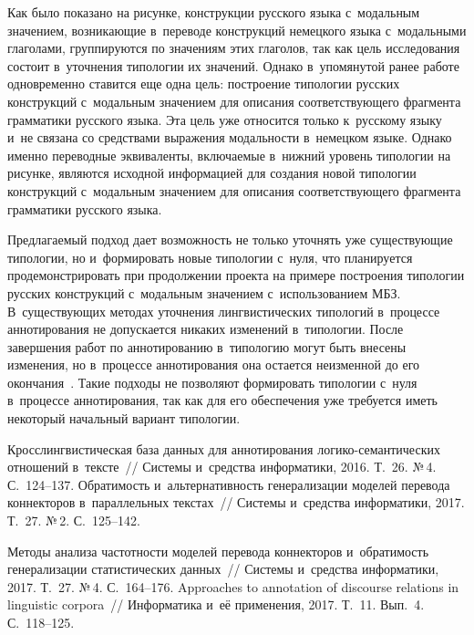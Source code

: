 \begin{multicols}{2}
  Как было показано на рисунке, конструкции русского языка с~модальным 
значением, возникающие в~переводе конструкций немецкого языка 
с~модальными глаголами, группируются по значениям этих глаголов, так как 
цель исследования со\-сто\-ит в~уточнения типологии их значений. Однако 
в~упомянутой ранее работе~\cite{9-zat} одновременно ставится еще одна цель: 
построение типологии русских конструкций с~модальным значением для 
описания соответствующего фрагмента грамматики русского языка. Эта цель 
уже относится только к~русскому языку и~не связана со средствами выражения 
модальности в~немецком языке. Однако именно переводные эквиваленты, 
включаемые в~нижний уровень типологии на рисунке, являются исходной 
информацией для создания новой типологии конструкций с~модальным 
значением для описания соответствующего фрагмента грамматики русского 
языка.
  
  Предлагаемый подход дает возможность не только уточнять уже 
существующие типологии, но и~формировать новые типологии с~нуля, что 
планируется продемонстрировать при продолжении проекта на примере 
построения типологии русских конструкций с~модальным значением 
с~использованием МБЗ. В~существующих методах уточнения лингвистических 
типологий в~процессе аннотирования не допускается никаких изменений 
в~типологии. После завершения работ по аннотированию в~типологию могут 
быть внесены изменения, но в~процессе аннотирования она остается 
неизменной до его окончания~\cite{15-zat}. Такие подходы не позволяют 
формировать типологии с~нуля в~процессе аннотирования, так как для его 
обеспечения уже требуется иметь некоторый начальный вариант типологии. 
  
 {\small\frenchspacing
 {%
 \begin{thebibliography}{99}
 
 Кросс\-линг\-ви\-сти\-че\-ская 
база данных для аннотирования ло\-ги\-ко-се\-ман\-ти\-че\-ских отношений 
в~тексте~// Сис\-те\-мы и~средства информатики, 2016. Т.~26. №\,4. С.~124--137.
 Обратимость 
и~альтернативность генерализации моделей перево\-да коннекторов 
в~параллельных текстах~// Сис\-те\-мы и~средства информатики, 2017. Т.~27. 
№\,2. С.~125--142.

 Методы анализа 
частотности моделей перевода коннекторов и~обратимость генерализации 
статистических данных~// Системы и~средства информатики, 2017. Т.~27. №\,4. 
С.~164--176.
 Approaches to annotation of discourse relations in linguistic 
corpora~// Информатика и~её применения, 2017. Т.~11. Вып.~4. С.~118--125.


\end{thebibliography}}}
\end{multicols}
